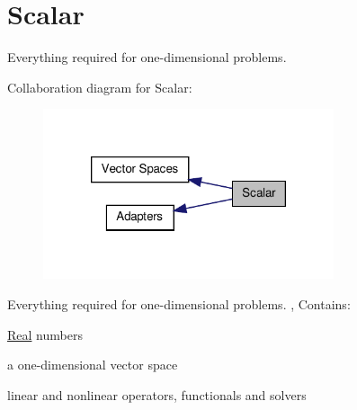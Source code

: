 \hypertarget{group__ScalarGroup}{\section{\-Scalar}
\label{group__ScalarGroup}
}


\-Everything required for one-\/dimensional problems.  


\-Collaboration diagram for \-Scalar\-:
\nopagebreak
\begin{figure}[H]
\begin{center}
\leavevmode
\includegraphics[width=242pt]{group__ScalarGroup}
\end{center}
\end{figure}
\-Everything required for one-\/dimensional problems. , \-Contains\-:
\begin{DoxyItemize}
\item \hyperlink{classSpacy_1_1Real}{\-Real} numbers
\item a one-\/dimensional vector space
\item linear and nonlinear operators, functionals and solvers 
\end{DoxyItemize}